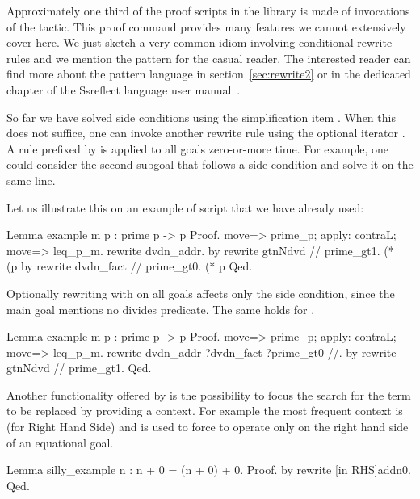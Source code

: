 \label{sec:rewrite}

Approximately one third of the proof scripts in the \mcbMC{} library is made of
invocations of the  tactic. This proof command provides many
features we cannot extensively cover here.  We just sketch a very common idiom
involving conditional rewrite rules and we mention the  pattern for
the casual reader.  The interested reader can find more about the pattern
language in section~\ref{sec:rewrite2} or in the dedicated chapter of
the Ssreflect language user manual~\cite{ssrman}.

So far we have solved side conditions using the simplification item \C{//}.
When this does not suffice, one can invoke another rewrite rule using
the optional iterator .  A rule prefixed by  is applied to
all goals zero-or-more time.  For example, one could consider the
second subgoal that follows  a side condition
and solve it on the same line.

Let us illustrate this on an example of script that we have already used:

\begin{coq}{}{}
Lemma example m p : prime p -> p %
Proof.
move=> prime_p; apply: contraL; move=> leq_p_m.
rewrite dvdn_addr.
  by rewrite gtnNdvd // prime_gt1. (* ~~ (p %
by rewrite dvdn_fact // prime_gt0. (* p %
Qed.
\end{coq}

Optionally rewriting with  on all goals affects only
the side condition, since the main goal mentions no divides predicate.
The same holds for .

\begin{coq}{}{}
Lemma example m p : prime p -> p %
Proof.
move=> prime_p; apply: contraL; move=> leq_p_m.
rewrite dvdn_addr ?dvdn_fact ?prime_gt0 //.
by rewrite gtnNdvd // prime_gt1.
Qed.
\end{coq}

Another functionality offered by  is the possibility
to focus the search for the term to be replaced by providing a
context.  For example the most frequent context is  (for Right
Hand Side) and is used to force  to operate only on the right
hand side of an equational goal.

\begin{coq}{}{}
Lemma silly_example n : n + 0 = (n + 0) + 0.
Proof. by rewrite [in RHS]addn0. Qed.
\end{coq}

